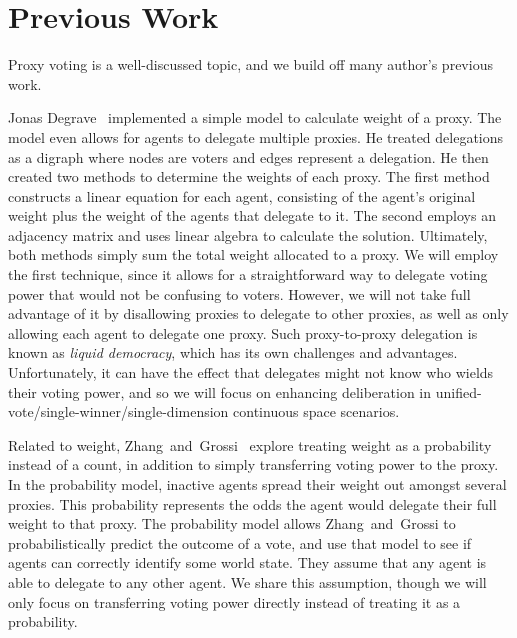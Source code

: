 \section{Previous Work}\label{sec:previous-work}
Proxy voting is a well-discussed topic, and we build off many author's previous work.

Jonas Degrave~\cite{Degrave2014} implemented a simple model to calculate 
weight of a proxy.
The model even allows for agents to delegate multiple proxies.
He treated delegations as a digraph where nodes are voters and edges represent
a delegation.
He then created two methods to determine the weights of each proxy.
The first method constructs a linear equation for each agent, consisting of the
agent's original weight plus the weight of the agents that delegate to it.
The second employs an adjacency matrix and uses linear algebra to calculate the
solution.
Ultimately, both methods simply sum the total weight allocated to a proxy.
We will employ the first technique, since it allows for a straightforward way to
delegate voting power that would not be confusing to voters.
However, we will not take full advantage of it by disallowing proxies to delegate to
other proxies, as well as only allowing each agent to delegate one proxy.
Such proxy-to-proxy delegation is known as \textit{liquid democracy}, which has its own
challenges and advantages.
Unfortunately, it can have the effect that delegates might not know who wields their
voting power, and so we will focus on enhancing deliberation in
unified-vote/single-winner/single-dimension continuous space scenarios.

Related to weight, Zhang~and~Grossi~\cite{Zhang2022} explore treating weight as a
probability instead of a count, in addition to simply transferring voting power to
the proxy.
In the probability model, inactive agents spread their weight out amongst several
proxies.
This probability represents the odds the agent would delegate their full weight to that
proxy.
The probability model allows Zhang~and~Grossi to probabilistically predict the
outcome of a vote, and use that model to see if agents can correctly identify some
world state.
They assume that any agent is able to delegate to any other agent.
We share this assumption, though we will only focus on transferring voting power
directly instead of treating it as a probability.

